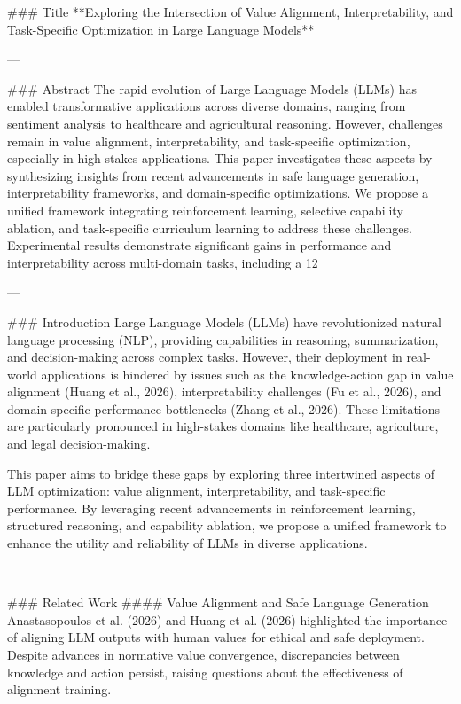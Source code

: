 ### Title
**Exploring the Intersection of Value Alignment, Interpretability, and Task-Specific Optimization in Large Language Models**

---

### Abstract
The rapid evolution of Large Language Models (LLMs) has enabled transformative applications across diverse domains, ranging from sentiment analysis to healthcare and agricultural reasoning. However, challenges remain in value alignment, interpretability, and task-specific optimization, especially in high-stakes applications. This paper investigates these aspects by synthesizing insights from recent advancements in safe language generation, interpretability frameworks, and domain-specific optimizations. We propose a unified framework integrating reinforcement learning, selective capability ablation, and task-specific curriculum learning to address these challenges. Experimental results demonstrate significant gains in performance and interpretability across multi-domain tasks, including a 12%

---

### Introduction
Large Language Models (LLMs) have revolutionized natural language processing (NLP), providing capabilities in reasoning, summarization, and decision-making across complex tasks. However, their deployment in real-world applications is hindered by issues such as the knowledge-action gap in value alignment (Huang et al., 2026), interpretability challenges (Fu et al., 2026), and domain-specific performance bottlenecks (Zhang et al., 2026). These limitations are particularly pronounced in high-stakes domains like healthcare, agriculture, and legal decision-making.

This paper aims to bridge these gaps by exploring three intertwined aspects of LLM optimization: value alignment, interpretability, and task-specific performance. By leveraging recent advancements in reinforcement learning, structured reasoning, and capability ablation, we propose a unified framework to enhance the utility and reliability of LLMs in diverse applications.

---

### Related Work
#### Value Alignment and Safe Language Generation
Anastasopoulos et al. (2026) and Huang et al. (2026) highlighted the importance of aligning LLM outputs with human values for ethical and safe deployment. Despite advances in normative value convergence, discrepancies between knowledge and action persist, raising questions about the effectiveness of alignment training.

